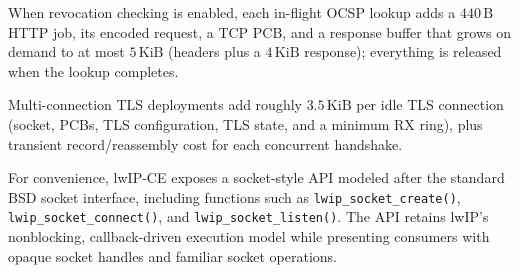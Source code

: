 \documentclass[titlepage]{report}
\begin{document}
			When revocation checking is enabled, each in-flight OCSP lookup adds a $440\,\text{B}$ HTTP job, its encoded request, a TCP PCB, and a response buffer that grows on demand to at most $5\,\text{KiB}$ (headers plus a $4\,\text{KiB}$ response); everything is released when the lookup completes.

			Multi-connection TLS deployments add roughly $3.5\,\text{KiB}$ per idle TLS connection (socket, PCBs, TLS configuration, TLS state, and a minimum RX ring), plus transient record/reassembly cost for each concurrent handshake.

			For convenience, lwIP-CE exposes a socket-style API modeled after the standard BSD socket interface, including functions such as \texttt{lwip\_socket\_create()}, \texttt{lwip\_socket\_connect()}, and \texttt{lwip\_socket\_listen()}. The API retains lwIP's nonblocking, callback-driven execution model while presenting consumers with opaque socket handles and familiar socket operations.
\end{document}
